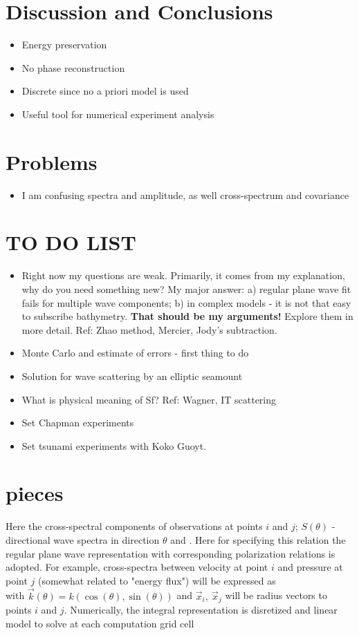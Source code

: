 \section{Discussion and Conclusions}
\begin{itemize}
\item Energy preservation
\item No phase reconstruction
\item Discrete since no a priori model is used
\item Useful tool for numerical experiment analysis
\end{itemize}




\section{Problems}
\begin{itemize}
\item I am confusing spectra and amplitude, as well cross-spectrum and covariance
\end{itemize}
\section{TO DO LIST}
\begin{itemize}
\item Right now my questions are weak. Primarily, it comes from my explanation, why do you need something new? My major answer: a) regular plane wave fit fails for multiple wave components; b) in complex models - it is not that easy to subscribe bathymetry. \textbf{That should be my arguments!} Explore them in more detail. Ref: Zhao method, Mercier, Jody's subtraction.

\item Monte Carlo and estimate of errors - first thing to do

\item Solution for wave scattering by an elliptic seamount

\item What is physical meaning of Sf? Ref: Wagner, IT scattering

\item Set Chapman experiments

\item Set tsunami experiments with Koko Guoyt.
\end{itemize}
\section{pieces}
Here the cross-spectral components of observations at points $i$ and $j$; $S(\theta)$ - directional wave spectra in direction $\theta$ and . Here for specifying this relation the regular plane wave representation with corresponding polarization relations is adopted. For example, cross-spectra between velocity at point $i$ and pressure at point $j$ (somewhat related to "energy flux") will be expressed as\\

with $\vec{k}(\theta) = k (\cos(\theta), \sin (\theta))$ and $\vec{x}_i,~\vec{x}_j$ will be radius vectors to points $i$ and $j$. Numerically, the integral representation is disretized and linear model to solve at each computation grid cell\\


